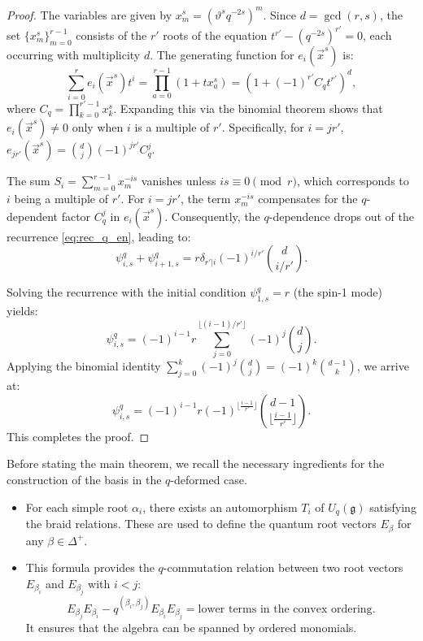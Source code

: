 \documentclass[reqno,11pt]{amsart}
\theoremstyle{plain}
\theoremstyle{definition}
\theoremstyle{remark}
\numberwithin{equation}{section}
\renewcommand{\theta}{\vartheta}
\newcommand{\1}{\mathds{1}}
\newcommand{\2}{\frac{1}{2}}
\begin{document}
{\begin{proof}
					{The variables are given by $x_m^s = (\theta^s q^{-2s})^m$. Since $d = \gcd(r, s)$, the set $\{x_m^s\}_{m=0}^{r-1}$ consists of the $r'$ roots of the equation $t^{r'} - (q^{-2s})^{r'} = 0$, each occurring with multiplicity $d$. The generating function for $e_i(\vec{{x}}^s)$ is:
						\begin{equation}
							\sum_{i=0}^r e_i(\vec{{x}}^s) t^i = \prod_{a=0}^{r-1} (1 + t x_a^s) = \left( 1 + (-1)^{r'} C_q t^{r'} \right)^d,
						\end{equation}
						where $C_q = \prod_{k=0}^{r'-1} x_k^s$. Expanding this via the binomial theorem shows that $e_i(\vec{{x}}^s) \neq 0$ only when $i$ is a multiple of $r'$. Specifically, for $i = j r'$, $e_{jr'}(\vec{{x}}^s) = \binom{d}{j} (-1)^{j r'} C_q^j$.}
					
					{The sum $S_i = \sum_{m=0}^{r-1} x_m^{-is}$ vanishes unless $is \equiv 0 \pmod{r}$, which corresponds to $i$ being a multiple of $r'$. For $i = j r'$, the term $x_m^{-is}$ compensates for the $q$-dependent factor $C_q^j$ in $e_i(\vec{{x}}^s)$. Consequently, the $q$-dependence drops out of the recurrence \eqref{eq:rec_q_en}, leading to:
						\begin{equation}
							\psi_{i,s}^q + \psi_{i+1,s}^q = r \delta_{r'|i} (-1)^{i/r'} \binom{d}{i/r'}.
					\end{equation}}
					
					{Solving the recurrence with the initial condition $\psi_{1,s}^q = r$ (the spin-1 mode) yields:
						\begin{equation}
							\psi_{i,s}^q = (-1)^{i-1} r \sum_{j=0}^{\lfloor (i-1)/r' \rfloor} (-1)^j \binom{d}{j}.
						\end{equation}
						Applying the binomial identity $\sum_{j=0}^k (-1)^j \binom{d}{j} = (-1)^k \binom{d-1}{k}$, we arrive at:
						\begin{equation}
							\psi_{i,s}^q = (-1)^{i-1} r (-1)^{\lfloor \frac{i-1}{r'} \rfloor} \binom{d-1}{\lfloor \frac{i-1}{r'} \rfloor}.
						\end{equation}
						This completes the proof.}
				\end{proof}
				
				Before stating the main theorem, we recall the necessary ingredients for the construction of the basis in the $q$-deformed case.
				
				\begin{itemize}
					\item[(a)] For each simple root $\alpha_i$, there exists an automorphism $T_i$ of $U_q(\mathfrak{g})$ satisfying the braid relations. These are used to define the quantum root vectors $E_{\beta}$ for any $\beta \in \Delta^+$.
					\item[(b)]  This formula provides the $q$-commutation relation between two root vectors $E_{\beta_i}$ and $E_{\beta_j}$ with $i < j$:
					\begin{equation}
						E_{\beta_j} E_{\beta_i} - q^{(\beta_i, \beta_j)} E_{\beta_i} E_{\beta_j} = \text{lower terms in the convex ordering}.
					\end{equation}
					It ensures that the algebra can be spanned by ordered monomials.
				\end{itemize} 
				
}
\end{document}
